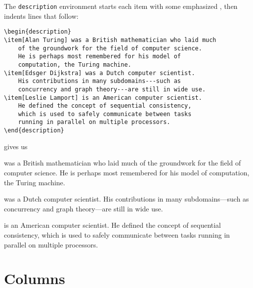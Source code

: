 \bigskip
\noindent The \texttt{description} environment starts each item with some
emphasized ,
then indents lines that follow:
\begin{leftfigure}
\begin{lstlisting}
\begin{description}
\item[Alan Turing] was a British mathematician who laid much
    of the groundwork for the field of computer science.
    He is perhaps most remembered for his model of
    computation, the Turing machine.
\item[Edsger Dijkstra] was a Dutch computer scientist.
    His contributions in many subdomains---such as
    concurrency and graph theory---are still in wide use.
\item[Leslie Lamport] is an American computer scientist.
    He defined the concept of sequential consistency,
    which is used to safely communicate between tasks
    running in parallel on multiple processors.
\end{description}
\end{lstlisting}
\end{leftfigure}
gives us
\begin{leftfigure}
\lm%
\begin{description}[leftmargin=*]
\item[\lm Alan Turing] was a British mathematician who laid much
    of the groundwork for the field of computer science.
    He is perhaps most remembered for his model of computation,
    the Turing machine.
\item[\lm Edsger Dijkstra] was a Dutch computer scientist.
    His contributions in many subdomains---such as
    concurrency and graph theory---are still in wide use.
\item[\lm Leslie Lamport] is an American computer scientist.
    He defined the concept of sequential consistency,
    which is used to safely communicate between tasks
    running in parallel on multiple processors.
\end{description}
\end{leftfigure}

\section{Columns}

